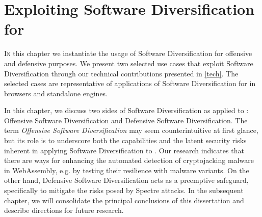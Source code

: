 \chapter{Exploiting Software Diversification for \Wasm}
\label{exploit}

\lettrine[lines=4]{I}{n} this chapter we instantiate the usage of Software Diversification for offensive and defensive purposes.
We present two selected use cases that exploit Software Diversification through our technical contributions presented in \autoref{tech}.
The selected cases are representative of applications of Software Diversification for \Wasm in browsers and standalone engines.







% 


In this chapter, we discuss two sides of Software Diversification as applied to \Wasm: Offensive Software Diversification and Defensive Software Diversification.
The term \emph{Offensive Software Diversification} may seem counterintuitive at first glance, but its role is to underscore both the capabilities and the latent security risks inherent in applying Software Diversification to \Wasm.
Our research indicates that there are ways for enhancing the automated detection of cryptojacking malware in WebAssembly, e.g. by testing their resilience with \Wasm malware variants.
On the other hand, Defensive Software Diversification acts as a preemptive safeguard, specifically to mitigate the risks posed by Spectre attacks.
In the subsequent chapter, we will consolidate the principal conclusions of this dissertation and describe directions for future research.